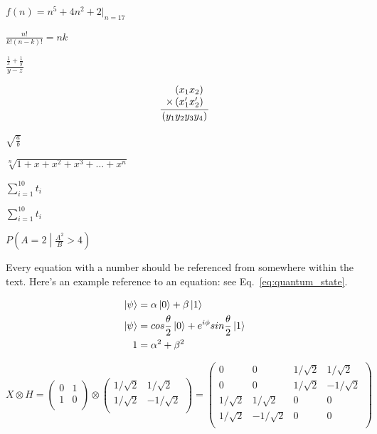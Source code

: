 $
f(n) = n^5 + 4n^2 + 2 |_{n=17}
$

$
\frac{n!}{k!(n-k)!} = {n}{k}
$

$\frac{\frac{1}{x}+\frac{1}{y}}{y-z}$

\begin{equation}
\frac{
    \begin{array}[b]{r}
      \left( x_1 x_2 \right)\\
      \times \left( x'_1 x'_2 \right)
    \end{array}
  }{
    \left( y_1y_2y_3y_4 \right)
  }
\end{equation}

$\sqrt{\frac{a}{b}}$

$\sqrt[n]{1+x+x^2+x^3+\dots+x^n}$

$\sum_{i=1}^{10} t_i$

$\displaystyle\sum_{i=1}^{10} t_i$

$P\left(A=2\middle|\frac{A^2}{B}>4\right)$

Every equation with a number should be referenced from somewhere within the text. Here's an example reference to an equation: see Eq.~\ref{eq:quantum_state}.

\begin{equation}
\begin{aligned} 
\label{eq:quantum_state}
\ket{\psi} &= \alpha\ket{0} + \beta\ket{1}  \\
   \ket{\psi} &= cos{\theta \over 2}\ket{0} + e^{i\phi}sin{\theta \over 2}\ket{1} \\
  1 &= \alpha^2 + \beta^2
\end{aligned}
\end{equation}

$$
X \otimes H = \begin{pmatrix}
0 & 1 \\
1 & 0 \\
\end{pmatrix} \otimes \begin{pmatrix}
1/\sqrt{2} & 1/\sqrt{2} \\
1/\sqrt{2} & -1/\sqrt{2} \\
\end{pmatrix} = \begin{pmatrix}
0 & 0 & 1/\sqrt{2} & 1/\sqrt{2} \\
0 & 0 & 1/\sqrt{2} & -1/\sqrt{2} \\
1/\sqrt{2} & 1/\sqrt{2} & 0 & 0 \\
1/\sqrt{2} & -1/\sqrt{2} & 0 & 0 \\
\end{pmatrix}
$$

